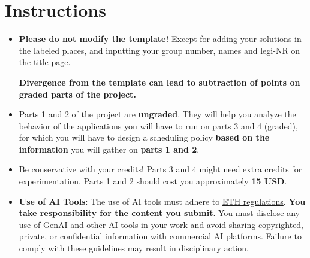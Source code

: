\documentclass[11pt]{article}
\begin{document}



\section*{Instructions}

\begin{itemize}
    \item {\color{red}\textbf{Please do not modify the template!}} Except for adding your solutions in the labeled places, and inputting your group number, names and legi-NR on the title page. 
    
    \textbf{Divergence from the template can lead to subtraction of points on graded parts of the project.}
    
    \item Parts 1 and 2 of the project are \textbf{ungraded}. They will help you analyze the behavior of the applications you will have to run on parts 3 and 4 (graded), for which you will have to design a scheduling policy \textbf{based on the information} you will gather on \textbf{parts 1 and 2}.

    \item Be conservative with your credits! Parts 3 and 4 might need extra credits for experimentation. Parts 1 and 2 should cost you approximately \textbf{15 USD}. %

    \item \textbf{Use of AI Tools}: The use of AI tools must adhere to \href{https://ethz.ch/staffnet/en/news-and-events/internal-news/archive/2024/07/new-guidelines-for-the-use-of-generative-ai-in-education.html}{ETH regulations}. \textbf{You take responsibility for the content you submit}. You must disclose any use of GenAI and other AI tools in your work and avoid sharing copyrighted, private, or confidential information with commercial AI platforms. Failure to comply with these guidelines may result in disciplinary action.

\end{itemize}

\newpage

% 
% 


\newcommand{\colored}[1]{\textcolor{#1}{#1}}
\newcommand{\coloredcell}[1]{\cellcolor{#1} #1}





% 
% 
\end{document}
